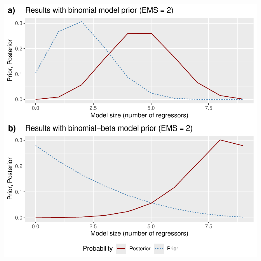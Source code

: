 \documentclass[a4paper]{article}
\begin{document}
\includegraphics{bdsm_vignette-028}
\end{document}
